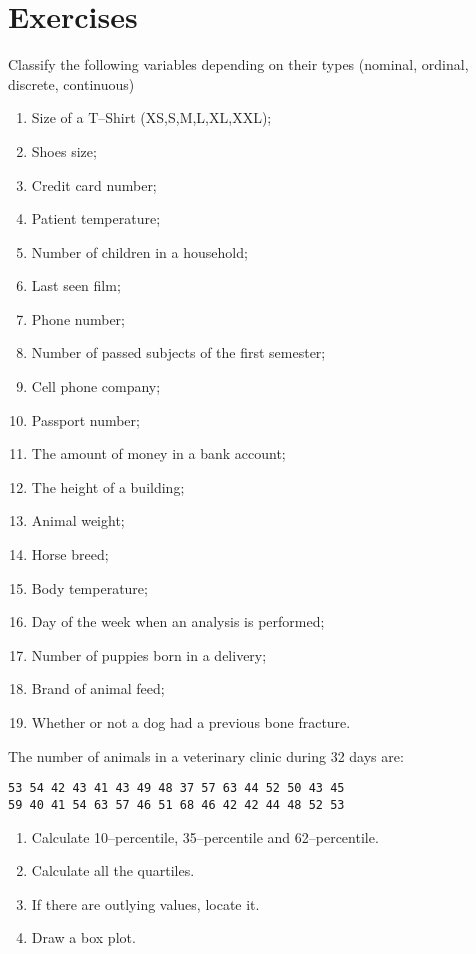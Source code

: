 \section{Exercises}
\label{exercisesChapterData}
\begin{problem}
Classify the following variables depending on their types (nominal,
ordinal, discrete, continuous)
\begin{multicols}{2}
  \begin{enumerate} \renewcommand{\theenumi}{\alph{enumi}}
\item Size of a T--Shirt (XS,S,M,L,XL,XXL);
\item Shoes size;
\item Credit card number;
\item Patient temperature;
\item Number of children in a household;
\item Last seen film;
\item Phone number;
\item Number of passed subjects of the first semester;
\item Cell phone company;
\item  Passport number;
\item The amount of money in a bank account;
\item The height of a building;
\item Animal weight; 
\item Horse breed; 
\item Body temperature;
\item Day of the week when an analysis is  performed; 
\item Number of puppies born in a delivery;
\item Brand of animal feed;
\item Whether or not a dog had a previous bone fracture.   
\end{enumerate}
\end{multicols}

\end{problem}



\begin{problem}
  The number of animals in a veterinary clinic   during 32 days are:
\begin{verbatim}
53 54 42 43 41 43 49 48 37 57 63 44 52 50 43 45
59 40 41 54 63 57 46 51 68 46 42 42 44 48 52 53
\end{verbatim}

\begin{enumerate} \renewcommand{\theenumi}{\alph{enumi}}
\item  Calculate 10--percentile, 35--percentile and 62--percentile.
\item Calculate all the quartiles.
\item If there are outlying values, locate it.

\item Draw a box plot.
\end{enumerate}
\end{problem}

